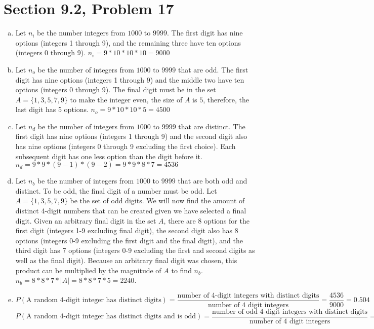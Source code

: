 \documentclass{article}
\author{Nathan Stouffer}
\begin{document}
\section*{Section 9.2, Problem 17}

\begin{enumerate}[a.]
	\item Let $n_i$ be the number integers from $1000$ to $9999$. The first digit has nine options (integers 1 through 9), and the remaining three have ten options (integers 0 through 9). $n_i=9*10*10*10=9000$
	\item Let $n_o$ be the number of integers from $1000$ to $9999$ that are odd. The first digit has nine options (integers 1 through 9) and the middle two have ten options (integers 0 through 9). The final digit must be in the set $A=\{1,3,5,7,9\}$ to make the integer even, the size of $A$ is $5$, therefore, the last digit has 5 options. $n_o=9*10*10*5=4500$
	\item Let $n_d$ be the number of integers from $1000$ to $9999$ that are distinct. The first digit has nine options (integers 1 through 9) and the second digit also has nine options (integers 0 through 9 excluding the first choice). Each subsequent digit has one less option than the digit before it. $n_d=9*9*(9-1)*(9-2)=9*9*8*7=4536$
	\item Let $n_b$ be the number of integers from $1000$ to $9999$ that are both odd and distinct. To be odd, the final digit of a number must be odd. Let $A=\{1,3,5,7,9\}$ be the set of odd digits. We will now find the amount of distinct 4-digit numbers that can be created given we have selected a final digit. Given an arbitrary final digit in the set $A$, there are 8 options for the first digit (integers 1-9 excluding final digit), the second digit also has 8 options (integers 0-9 excluding the first digit and the final digit), and the third digit has 7 options (integers 0-9 excluding the first and second digits as well as the final digit). Because an arbitrary final digit was chosen, this product can be multiplied by the magnitude of $A$ to find $n_b$. $n_b=8*8*7*|A|=8*8*7*5=2240$.
	\item $P(\text{A random 4-digit integer has distinct digits})=\dfrac{\text{number of 4-digit integers with distinct digits}}{\text{number of 4 digit integers}}=\dfrac{4536}{9000}=0.504$ \\
	$P(\text{A random 4-digit integer has distinct digits and is odd})=\dfrac{\text{number of odd 4-digit integers with distinct digits}}{\text{number of 4 digit integers}}=\dfrac{2240}{9000}=0.2488$
\end{enumerate}

\clearpage
\header
\end{document}
